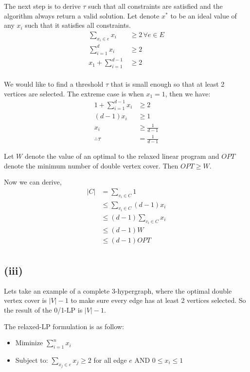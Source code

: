 The next step is to derive $\tau$ such that all constraints are satisfied and the algorithm always return a valid solution. Let denote
$x^*$ to be an ideal value of any $x_i$ such that it satisfies all constraints.
\begin{align*}
\sum\limits_{x_{i} \in e} x_i &\geq 2 \, \forall e \in E \\
\sum\limits_{i=1}^d x_i &\geq 2 \\
x_1 + \sum\limits_{i=1}^{d-1} &\geq 2 \\
\end{align*}

We would like to find a threshold $\tau$ that is small enough so that at least 2 vertices are selected. The extreme case is when $x_1 = 1$, then we have:
\begin{align*}
1 + \sum\limits_{i=1}^{d-1} x_i &\geq 2 \\
(d-1) x_i &\geq 1 \\
x_i &\geq \frac{1}{d-1} \\
\therefore \tau &= \frac{1}{d-1}
\end{align*}


Let $W$ denote the value of an optimal to the relaxed linear program and $OPT$ denote the minimum number of double vertex cover.
Then $OPT \geq W$.

Now we can derive,
\begin{align*}
    |C| &= \sum\limits_{v_i \in C} 1 \\
        &\leq \sum\limits_{v_i \in C} (d-1)x_i \\
        &\leq (d-1) \sum\limits_{v_i \in C} x_i \\
        &\leq (d-1)W \\
        &\leq (d-1)OPT \\
\end{align*}

\subsection*{(iii)}
Lets take an example of a complete 3-hypergraph, where the optimal double vertex cover is $|V| - 1$ to make sure every edge has at least 2 vertices selected. So the result of the 0/1-LP is $|V| - 1$.

The relaxed-LP formulation is as follow:

\begin{itemize}
  \item Miminize $\sum_{i=1}^{n} x_i$
  
  \item Subject to:
    $\sum_{x_j \in e} x_j \geq 2$ for all edge $e$
    AND $0 \leq x_i \leq 1$
\end{itemize}


